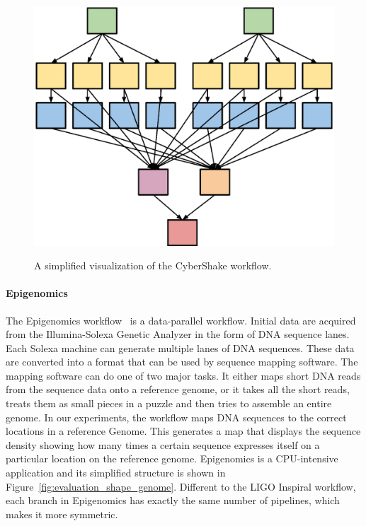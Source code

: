\documentclass[final,5p,times,twocolumn]{elsarticle}
\begin{document}
\begin{figure}[htb]
	\centering
	\includegraphics[width=0.55\linewidth]{figure16.eps} \\
	\caption{A simplified visualization of the CyberShake workflow.}
	\label{fig:evaluation_shape_cybershake}
\end{figure}

\paragraph{\textbf{Epigenomics}}
The Epigenomics workflow~\cite{Epigenome} is a data-parallel workflow. Initial data are acquired from the Illumina-Solexa Genetic Analyzer in the form of DNA sequence lanes. Each Solexa machine can generate multiple lanes of DNA sequences. These data are converted into a format that can be used by sequence mapping software. The mapping software can do one of two major tasks. It either maps short DNA reads from the sequence data onto a reference genome, or it takes all the short reads, treats them as small pieces in a puzzle and then tries to assemble an entire genome. In our experiments, the workflow maps DNA sequences to the correct locations in a reference Genome. This generates a map that displays the sequence density showing how many times a certain sequence expresses itself on a particular location on the reference genome. Epigenomics is a CPU-intensive application and its simplified structure is shown in Figure~\ref{fig:evaluation_shape_genome}. Different to the LIGO Inspiral workflow, each branch in Epigenomics has exactly the same number of pipelines, which makes it more symmetric. 
\end{document}
